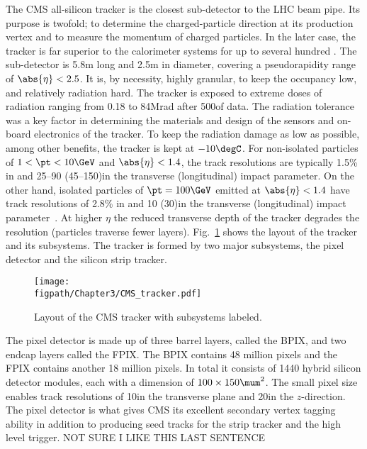 The CMS all-silicon tracker is the closest sub-detector to the LHC beam pipe.
Its purpose is twofold; to determine the charged-particle direction at its production vertex and to measure the momentum of charged particles.
In the later case, the tracker is far superior to the calorimeter systems for \pt up to several hundred \gev.
The sub-detector is 5.8\unit{m} long and 2.5\unit{m} in diameter, covering a pseudorapidity range of $\abs{\eta}<2.5$.
It is, by necessity, highly granular, to keep the occupancy low, and relatively radiation hard.
The tracker is exposed to extreme doses of radiation ranging from 0.18 to 84\unit{Mrad} after 500\fbinv of data.
The radiation tolerance was a key factor in determining the materials and design of the sensors and on-board electronics of the tracker.
To keep the radiation damage as low as possible, among other benefits, the tracker is kept at $-10\degC$.
For non-isolated particles of $1<\pt<10\GeV$ and $\abs{\eta}<1.4$, the track resolutions are typically 1.5\% in \pt and 25--90 (45--150)\mum in the transverse (longitudinal) impact parameter.
On the other hand, isolated particles of $\pt=100\GeV$ emitted at $\abs{\eta}<1.4$ have track resolutions of 2.8\% in \pt and 10 (30)\mum in the transverse (longitudinal) impact parameter~\cite{TRK-11-001}.
At higher $\eta$ the reduced transverse depth of the tracker degrades the resolution (particles traverse fewer layers).
Fig.~\ref{fig:CMS_tracker} shows the layout of the tracker and its subsystems. The tracker is formed by two major subsystems, the pixel detector and the silicon strip tracker.


\begin{figure}[!hbt]
    \centering
    \texttt{[image: \\figpath/Chapter3/CMS\_tracker.pdf]}
    \caption{Layout of the CMS tracker with subsystems labeled.}
    \label{fig:CMS_tracker}
\end{figure}

The pixel detector is made up of three barrel layers, called the BPIX, and two endcap layers called the FPIX.
The BPIX contains 48 million pixels and the FPIX contains another 18 million pixels.
In total it consists of 1440 hybrid silicon detector modules, each with a dimension of $100\times150\mum^{2}$.
The small pixel size enables track resolutions of 10\mum in the transverse plane and 20\mum in the $z$-direction.
The pixel detector is what gives CMS its excellent secondary vertex tagging ability in addition to producing seed tracks for the strip tracker and the high level trigger.
NOT SURE I LIKE THIS LAST SENTENCE


